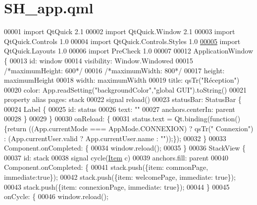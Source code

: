 \hypertarget{SH__app_8qml}{\section{S\-H\-\_\-app.\-qml}
\label{SH__app_8qml}
}

\begin{DoxyCode}
00001 \textcolor{keyword}{import} QtQuick 2.1
00002 import QtQuick.Window 2.1
00003 import QtQuick.Controls 1.0
00004 import QtQuick.Controls.Styles 1.0
\hypertarget{SH__app_8qml_source_l00005}{}\hyperlink{classSH__app}{00005} import QtQuick.Layouts 1.0
00006 import PreCheck 1.0
00007 
00012 ApplicationWindow \{
00013     \textcolor{keywordtype}{id}: window
00014     visibility: Window.Windowed
00015     \textcolor{comment}{/*maximumHeight: 600*/}
00016     \textcolor{comment}{/*maximumWidth: 800*/}
00017     height: maximumHeight
00018     width: maximumWidth
00019     title: qsTr(\textcolor{stringliteral}{"Réception"})
00020     color: App.readSetting(\textcolor{stringliteral}{"backgroundColor"},\textcolor{stringliteral}{"global GUI"}).toString()
00021     \textcolor{keyword}{property} alias pages: stack
00022     signal reload()
00023     statusBar: StatusBar \{
00024         Label \{
00025             \textcolor{keywordtype}{id}: status
00026             text: \textcolor{stringliteral}{""}
00027             anchors.centerIn: parent
00028         \}
00029     \}
00030     onReload: \{
00031         status.text = Qt.binding(\textcolor{keyword}{function}() \{\textcolor{keywordflow}{return} ((App.currentMode === AppMode.CONNEXION) ? qsTr(\textcolor{stringliteral}{"
      Connexion"}) : (App.currentUser.valid ? App.currentUser.name : \textcolor{stringliteral}{""}));\});
00032     \}
00033     Component.onCompleted: \{
00034         window.reload();
00035     \}
00036     StackView \{
00037         \textcolor{keywordtype}{id}: stack
00038         signal cycle(\hyperlink{classItem}{Item} c)
00039         anchors.fill: parent
00040         Component.onCompleted: \{
00041             stack.push(\{item: commonPage, immediate:\textcolor{keyword}{true}\});
00042             stack.push(\{item: welcomePage, immediate: \textcolor{keyword}{true}\});
00043             stack.push(\{item: connexionPage, immediate: \textcolor{keyword}{true}\});
00044         \}
00045         onCycle: \{
00046             window.reload();

\end{DoxyCode}
